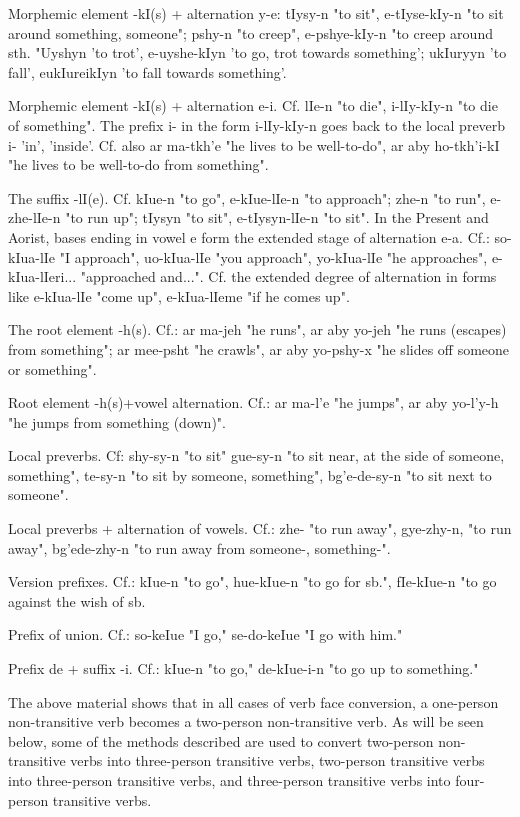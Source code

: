 \documentclass[a4paper,12pt]{book}
\newcommand{\1}[1]{\textbf{\emph{#1}}} %
\newcommand{\2}[1]{\textbf{[#1]}} %
\newcommand{\3}[1]{\fontsize{11pt}{0cm}\textbf{\emph{#1}}} %
\newcommand{\4}[1]{\fontsize{10pt}{0cm}\emph{#1}}	%
\newcommand{\5}[1]{\textbf{/#1/}} %
\newcommand{\6}[1]{\textbf{[#1]}} %
\newcommand{\7}[1]{\fontsize{12pt}{0cm}\emph{#1}} %
\newcommand{\8}[1]{\fontsize{12pt}{0cm}`#1'} %
\newcommand{\9}[1]{\fontsize{12pt}{0cm}(lit. `#1')} %
\begin{document}
\begin{xlist}
\ex Morphemic element -kI(s) + alternation y-e: tIysy-n "to sit", e-tIyse-kIy-n "to sit around something, someone"; pshy-n "to creep", e-pshye-kIy-n "to creep around sth. "Uyshyn 'to trot', e-uyshe-kIyn 'to go, trot towards something'; ukIuryyn 'to fall', eukIureikIyn 'to fall towards something'.

\ex Morphemic element -kI(s) + alternation e-i. Cf. lIe-n "to die", i-lIy-kIy-n "to die of something". The prefix i- in the form i-lIy-kIy-n goes back to the local preverb i- 'in', 'inside'. Cf. also ar ma-tkh'e "he lives to be well-to-do", ar aby ho-tkh'i-kI "he lives to be well-to-do from something".

\ex The suffix -lI(e). Cf. kIue-n "to go", e-kIue-lIe-n "to approach"; zhe-n "to run", e-zhe-lIe-n "to run up"; tIysyn "to sit", e-tIysyn-lIe-n "to sit". In the Present and Aorist, bases ending in vowel e form the extended stage of alternation e-a. Cf.: so-kIua-lIe "I approach", uo-kIua-lIe "you approach", yo-kIua-lIe "he approaches", e-kIua-lIeri... "approached and...". Cf. the extended degree of alternation in forms like e-kIua-lIe "come up", e-kIua-lIeme "if he comes up".

\ex The root element -h(s). Cf.: ar ma-jeh "he runs", ar aby yo-jeh "he runs (escapes) from something"; ar mee-psht "he crawls", ar aby yo-pshy-x "he slides off someone or something".

\ex Root element -h(s)+vowel alternation. Cf.: ar ma-l'e "he jumps", ar aby yo-l'y-h "he jumps from something (down)".

\ex Local preverbs. Cf: shy-sy-n "to sit" gue-sy-n "to sit near, at the side of someone, something", te-sy-n "to sit by someone, something", bg'e-de-sy-n "to sit next to someone".

\ex Local preverbs + alternation of vowels. Cf.: zhe- "to run away", gye-zhy-n, "to run away", bg'ede-zhy-n "to run away from someone-, something-".

\ex Version prefixes. Cf.: kIue-n "to go", hue-kIue-n "to go for sb.", fIe-kIue-n "to go against the wish of sb.

\ex Prefix of union. Cf.: so-keIue "I go," se-do-keIue "I go with him."

Prefix de + suffix -i. Cf.: kIue-n "to go," de-kIue-i-n "to go up to something."

\end{xlist}

The above material shows that in all cases of verb face conversion, a one-person non-transitive verb becomes a two-person non-transitive verb. As will be seen below, some of the methods described are used to convert two-person non-transitive verbs into three-person transitive verbs, two-person transitive verbs into three-person transitive verbs, and three-person transitive verbs into four-person transitive verbs.
\end{document}
